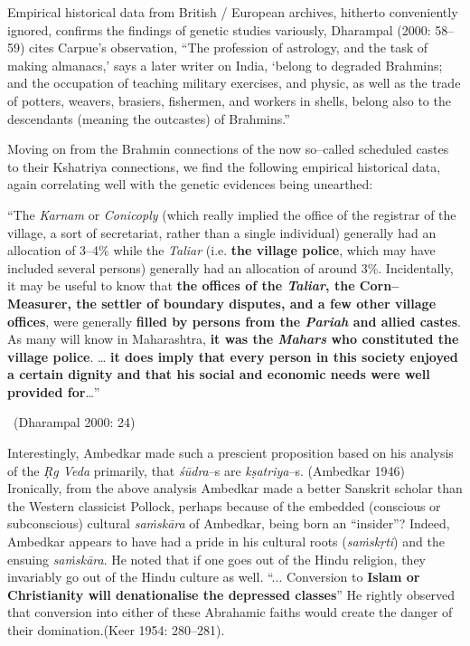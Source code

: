Empirical historical data from British / European archives, hitherto conveniently ignored, confirms the findings of genetic studies variously, Dharampal (2000: 58–59) cites Carpue’s observation, “The profession of astrology, and the task of making almanacs,’ says a later writer on India, ‘belong to degraded Brahmins; and the occupation of teaching military exercises, and physic, as well as the trade of potters, weavers, brasiers, fishermen, and workers in shells, belong also to the descendants (meaning the outcastes) of Brahmins.”

Moving on from the Brahmin connections of the now so–called scheduled castes to their Kshatriya connections, we find the following empirical historical data, again correlating well with the genetic evidences being unearthed:

\begin{myquote}
“The \textit{Karnam} or \textit{Conicoply} (which really implied the office of the registrar of the village, a sort of secretariat, rather than a single individual) generally had an allocation of 3–4\% while the \textit{Taliar} (i.e. \textbf{the village police}, which may have included several persons) generally had an allocation of around 3\%. Incidentally, it may be useful to know that \textbf{the offices of the \textit{Taliar}, the Corn–Measurer, the settler of boundary disputes, and a few other village offices}, were generally \textbf{filled by persons from the \textit{Pariah} and allied castes}. As many will know in Maharashtra, \textbf{it was the \textit{Mahars} who constituted the village police}. … \textbf{it does imply that every person in this society enjoyed a certain dignity and that his social and economic needs were well provided for}…” 

~\hfill (Dharampal 2000: 24)
\end{myquote}

Interestingly, Ambedkar made such a prescient proposition based on his analysis of the \textit{Ṛg Veda} primarily, that \textit{śūdra}–s are \textit{kṣatriya}–s. (Ambedkar 1946) Ironically, from the above analysis Ambedkar made a better Sanskrit scholar than the Western classicist Pollock, perhaps because of the embedded (conscious or subconscious) cultural \textit{saṁskāra} of Ambedkar, being born an “insider”? Indeed, Ambedkar appears to have had a pride in his cultural roots (\textit{saṁskṛti}) and the ensuing \textit{saṁskāra}. He noted that if one goes out of the Hindu religion, they invariably go out of the Hindu culture as well. “... Conversion to \textbf{Islam or Christianity will denationalise the depressed classes}” He rightly observed that conversion into either of these Abrahamic faiths would create the danger of their domination.(Keer 1954: 280–281).

